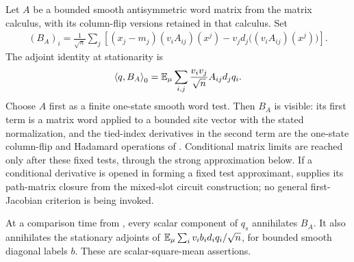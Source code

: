 Let $A$ be a bounded smooth antisymmetric word matrix from the matrix
calculus, with its column-flip versions retained in that calculus.  Set
\begin{align}\label{eq:exact-adjoint}
 (B_A)_i
 =\frac1{\sqrt n}\sum_j\left[
 (x_j-m_j)(v_iA_{ij})(x^j)
 -v_jd_j\bigl((v_iA_{ij})(x^j)\bigr)\right].
\end{align}
The adjoint identity at stationarity is
\begin{equation}\label{eq:exact-curl-adjoint}
 \left\langle q,B_A\right\rangle_0
 =\mathbb E_\mu\sum_{i,j}\frac{v_iv_j}{\sqrt n}A_{ij}d_jq_i.
\end{equation}
Choose $A$ first as a finite one-state smooth word test.  Then $B_A$ is
visible: its first term is a matrix word applied to a bounded site vector
with the stated normalization, and the tied-index derivatives in the
second term are the one-state column-flip and Hadamard operations of
.  Conditional matrix limits are reached only
after these fixed tests, through the strong approximation below.  If a
conditional derivative is opened in forming a fixed test approximant,
 supplies its path-matrix closure from
the mixed-slot circuit construction; no general first-Jacobian criterion
is being invoked.

\begin{lemma}
\label{lem:exact-adjoints}
At a comparison time from , every scalar
component of $q_s$ annihilates $B_A$.  It also annihilates the stationary
adjoints of
$\mathbb E_\mu\sum_i v_i b_i d_iq_i/\sqrt n$, for bounded smooth diagonal labels
$b$.  These are scalar-square-mean assertions.
\end{lemma}


